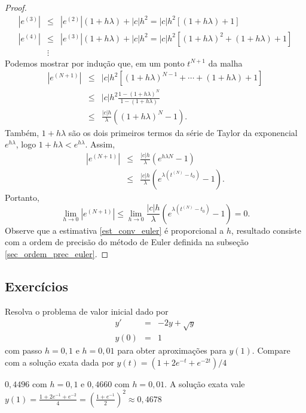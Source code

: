 \begin{proof}
\begin{eqnarray*}
|e^{(3)}|&\leq &|e^{(2)}|\left(1+h\lambda\right)+|c|h^2=|c|h^2\left[\left(1+h\lambda\right)+1\right]\\
|e^{(4)}|&\leq &|e^{(3)}|\left(1+h\lambda\right)+|c|h^2=|c|h^2\left[\left(1+h\lambda\right)^2+\left(1+h\lambda\right)+1\right]\\
&\vdots &
\end{eqnarray*}
Podemos mostrar por indução que, em um ponto $t^{N+1}$ da malha
\begin{eqnarray*}
|e^{(N+1)}|&\leq&|c|h^2\left[\left(1+h\lambda\right)^{N-1}+\cdots+\left(1+h\lambda\right)+1\right]\\
&\leq&|c|h^2\frac{1-\left(1+h\lambda\right)^{N}}{1-\left(1+h\lambda\right)}\\
&\leq&\frac{|c|h}{\lambda}\left(\left(1+h\lambda\right)^{N}-1\right).
\end{eqnarray*}
Também, $1+h\lambda$ são os dois primeiros termos da série de Taylor da exponencial $e^{h\lambda}$, logo $1+h\lambda<e^{h\lambda}$. Assim,
\begin{eqnarray*}
|e^{(N+1)}|&\leq&\frac{|c|h}{\lambda}\left(e^{h\lambda N}-1\right)\\
&\leq&\frac{|c|h}{\lambda}\left(e^{\lambda (t^{(N)}-t_0) }-1\right).
\end{eqnarray*}
Portanto, 
\begin{equation}\label{est_conv_euler}
\lim_{h\to 0} |e^{(N+1)}| \leq \lim_{h\to 0}\frac{|c|h}{\lambda}\left(e^{\lambda (t^{(N)}-t_0) }-1\right)=0.
\end{equation}
Observe que a estimativa \eqref{est_conv_euler} é proporcional a $h$, resultado consiste com a ordem de precisão do método de Euler definida na subseção \ref{sec_ordem_prec_euler}.


\end{proof}


\subsection*{Exercícios}

\begin{exer}Resolva o problema de valor inicial dado por
\begin{eqnarray*}
y'&=& -2y + \sqrt{y}\\
y(0)&=&1
\end{eqnarray*}
com passo $h=0,1$ e $h=0,01$ para obter aproximações para $y(1)$. Compare com a solução exata dada por $y(t) =  \left({1+2 e^{-t}+e^{-2 t}}\right)/{4}$
\end{exer}
\begin{resp}
  
 $0,4496$ com $h=0,1$ e $0,4660$ com $h=0,01$. A solução exata vale $y(1)=\frac{1+2e^{-1}+e^{-2}}{4}= \left(\frac{1+e^{-1}}{2}\right)^2\approx 0,4678$    
  
\end{resp}



